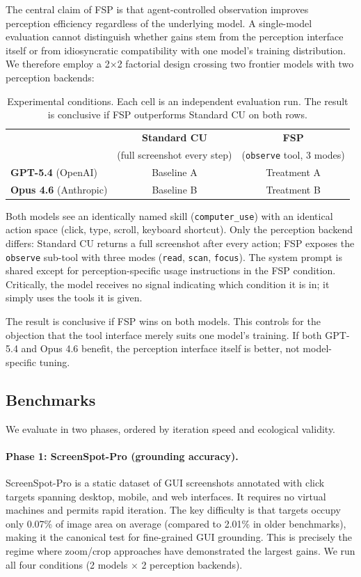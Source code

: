 \documentclass[11pt,a4paper]{article}
\begin{document}
The central claim of FSP is that agent-controlled observation improves perception efficiency regardless of the underlying model. A single-model evaluation cannot distinguish whether gains stem from the perception interface itself or from idiosyncratic compatibility with one model's training distribution. We therefore employ a 2$\times$2 factorial design crossing two frontier models with two perception backends:

\begin{table}[h]
\centering
\caption{Experimental conditions. Each cell is an independent evaluation run. The result is conclusive if FSP outperforms Standard CU on both rows.}
\label{tab:conditions}
\begin{tabular}{lcc}
\toprule
& \textbf{Standard CU} & \textbf{FSP} \\
& (full screenshot every step) & (\texttt{observe} tool, 3 modes) \\
\midrule
\textbf{GPT-5.4} (OpenAI)     & Baseline A  & Treatment A \\
\textbf{Opus 4.6} (Anthropic)  & Baseline B  & Treatment B \\
\bottomrule
\end{tabular}
\end{table}

Both models see an identically named skill (\texttt{computer\_use}) with an identical action space (click, type, scroll, keyboard shortcut). Only the perception backend differs: Standard CU returns a full screenshot after every action; FSP exposes the \texttt{observe} sub-tool with three modes (\texttt{read}, \texttt{scan}, \texttt{focus}). The system prompt is shared except for perception-specific usage instructions in the FSP condition. Critically, the model receives no signal indicating which condition it is in; it simply uses the tools it is given.

The result is conclusive if FSP wins on both models. This controls for the objection that the tool interface merely suits one model's training. If both GPT-5.4 and Opus 4.6 benefit, the perception interface itself is better, not model-specific tuning.

\subsection{Benchmarks}

We evaluate in two phases, ordered by iteration speed and ecological validity.

\paragraph{Phase 1: ScreenSpot-Pro (grounding accuracy).}
ScreenSpot-Pro \cite{screenspot-pro} is a static dataset of GUI screenshots annotated with click targets spanning desktop, mobile, and web interfaces. It requires no virtual machines and permits rapid iteration. The key difficulty is that targets occupy only 0.07\% of image area on average (compared to 2.01\% in older benchmarks), making it the canonical test for fine-grained GUI grounding. This is precisely the regime where zoom/crop approaches have demonstrated the largest gains. We run all four conditions (2 models $\times$ 2 perception backends).
\end{document}
